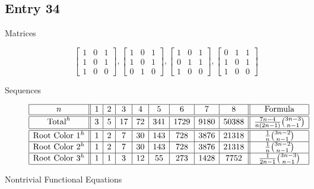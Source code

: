 \documentclass[12pt]{amsart}
\begin{document}
\subsection*{Entry 34}
\begin{description}
    \item[Matrices]
    
    \[\begin{bmatrix}
1 & 0 & 1 \\
1 & 0 & 1 \\
1 & 0 & 0
\end{bmatrix}, \begin{bmatrix}
1 & 0 & 1 \\
1 & 0 & 1 \\
0 & 1 & 0
\end{bmatrix},\begin{bmatrix}
1 & 0 & 1 \\
0 & 1 & 1 \\
1 & 0 & 0
\end{bmatrix}, \begin{bmatrix}
0 & 1 & 1 \\
1 & 0 & 1 \\
1 & 0 & 0
\end{bmatrix}\]
    \item[Sequences]\hspace*{\fill}\vspace{-0.5cm}
    
    \begin{center}
        \[
        \begin{array}{|c||c|c|c|c|c|c|c|c||c|}\hline
           n  & 1 & 2 & 3 & 4 & 5 & 6 & 7 & 8  & \text{Formula}\\\hline\hline
           \text{Total}^{h}  & 3 & 5 & 17 & 72 & 341 & 1729 & 9180 & 50388 & \frac{7n-4}{n(2n-1)}\binom{3n-3}{n-1}\\\hline\hline
           \text{Root Color }1^h & 1 & 2 & 7 & 30 & 143 & 728 & 3876 & 21318 & \frac{1}{n}\binom{3n-2}{n-1}\\\hline
           \text{Root Color }2^h & 1 & 2 & 7 & 30 & 143 & 728 & 3876 & 21318 & \frac{1}{n}\binom{3n-2}{n-1}\\\hline
           \text{Root Color }3^h & 1 & 1 & 3 & 12 & 55 & 273 & 1428 & 7752 & \frac{1}{2n-1}\binom{3n-3}{n-1}\\\hline
        \end{array}
        \]
    \end{center}
    \item[Nontrivial Functional Equations]\hspace*{\fill}


\end{description}
\end{document}
